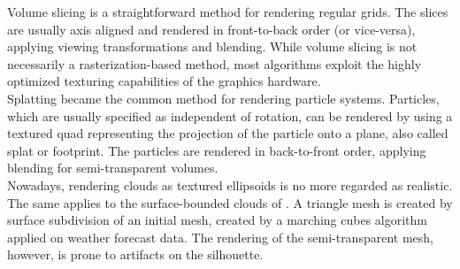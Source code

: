 Volume slicing is a straightforward method for rendering regular grids. The slices are usually axis aligned and rendered in front-to-back order (or vice-versa), applying viewing transformations and blending. While volume slicing is not necessarily a rasterization-based method, most algorithms exploit the highly optimized texturing capabilities of the graphics hardware.\\
Splatting became the common method for rendering particle systems. Particles, which are usually specified as independent of rotation, can be rendered by using a textured quad representing the projection of the particle onto a plane, also called splat or footprint. The particles are rendered in back-to-front order, applying blending for semi-transparent volumes. \\
Nowadays, rendering clouds as textured ellipsoids is no more regarded as realistic. The same applies to the surface-bounded clouds of . A triangle mesh is created by surface subdivision of an initial mesh, created by a marching cubes algorithm applied on weather forecast data. The rendering of the semi-transparent mesh, however, is prone to artifacts on the silhouette.